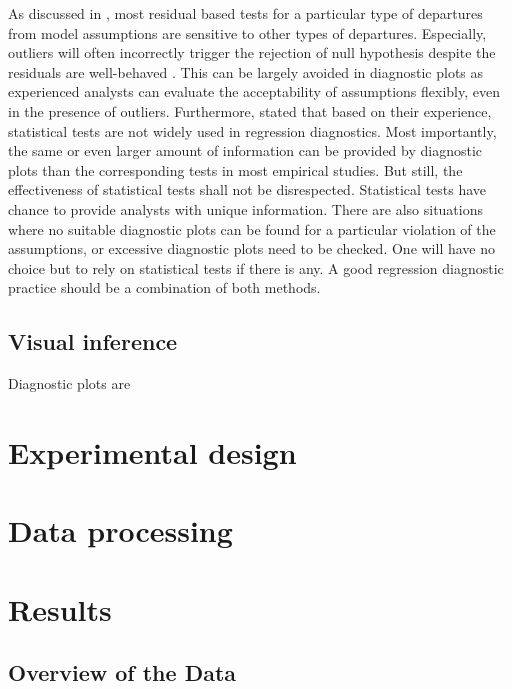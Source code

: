 \documentclass[]{interact}
\theoremstyle{plain}%
\theoremstyle{definition}
\theoremstyle{remark}
\begin{document}
As discussed in \citet{cook1982residuals}, most residual based tests for
a particular type of departures from model assumptions are sensitive to
other types of departures. Especially, outliers will often incorrectly
trigger the rejection of null hypothesis despite the residuals are
well-behaved \citep{cook_applied_1999}. This can be largely avoided in
diagnostic plots as experienced analysts can evaluate the acceptability
of assumptions flexibly, even in the presence of outliers. Furthermore,
\citet{montgomery_introduction_2012} stated that based on their
experience, statistical tests are not widely used in regression
diagnostics. Most importantly, the same or even larger amount of
information can be provided by diagnostic plots than the corresponding
tests in most empirical studies. But still, the effectiveness of
statistical tests shall not be disrespected. Statistical tests have
chance to provide analysts with unique information. There are also
situations where no suitable diagnostic plots can be found for a
particular violation of the assumptions, or excessive diagnostic plots
need to be checked. One will have no choice but to rely on statistical
tests if there is any. A good regression diagnostic practice should be a
combination of both methods.

\hypertarget{visual-inference}{%
\subsection{Visual inference}\label{visual-inference}}

Diagnostic plots are

\hypertarget{experimental-design}{%
\section{Experimental design}\label{experimental-design}}

\hypertarget{data-processing}{%
\section{Data processing}\label{data-processing}}

\hypertarget{results}{%
\section{Results}\label{results}}

\hypertarget{overview-of-the-data}{%
\subsection{Overview of the Data}\label{overview-of-the-data}}
\end{document}
